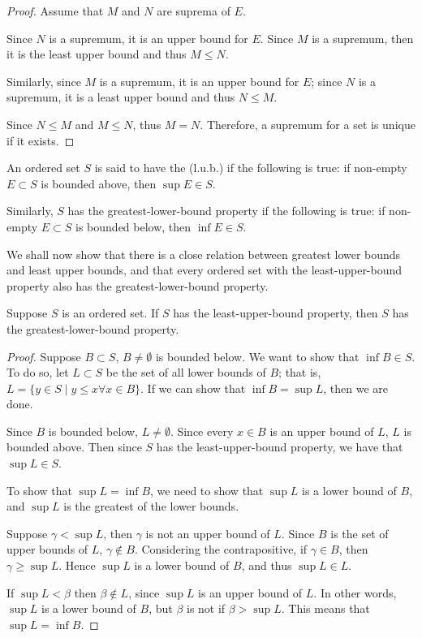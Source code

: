 \begin{proof}
Assume that $M$ and $N$ are suprema of $E$.

Since $N$ is a supremum, it is an upper bound for $E$. Since $M$ is a supremum, then it is the least upper bound and thus $M \le N$. 

Similarly, since $M$ is a supremum, it is an upper bound for $E$; since $N$ is a supremum, it is a least upper bound and thus $N \le M$.

Since $N \le M$ and $M \le N$, thus $M=N$. Therefore, a supremum for a set is unique if it exists.
\end{proof}

\begin{definition}
An ordered set $S$ is said to have the  (l.u.b.) if the following is true: if non-empty $E\subset S$ is bounded above, then $\sup E\in S$.

Similarly, $S$ has the greatest-lower-bound property if the following is true: if non-empty $E\subset S$ is bounded below, then $\inf E\in S$.
\end{definition}

We shall now show that there is a close relation between greatest lower bounds and least upper bounds, and that every ordered set with the least-upper-bound property also has the greatest-lower-bound property.

\begin{theorem}
Suppose $S$ is an ordered set. If $S$ has the least-upper-bound property, then $S$ has the greatest-lower-bound property.
\end{theorem}

\begin{proof}
Suppose $B\subset S$, $B\neq\emptyset$ is bounded below. We want to show that $\inf B\in S$. To do so, let $L\subset S$ be the set of all lower bounds of $B$; that is, $L=\{y\in S\mid y\le x\forall x\in B\}$. If we can show that $\inf B=\sup L$, then we are done.

Since $B$ is bounded below, $L\neq\emptyset$. Since every $x\in B$ is an upper bound of $L$, $L$ is bounded above. Then since $S$ has the least-upper-bound property, we have that $\sup L\in S$.

To show that $\sup L=\inf B$, we need to show that $\sup L$ is a lower bound of $B$, and $\sup L$ is the greatest of the lower bounds.

Suppose $\gamma<\sup L$, then $\gamma$ is not an upper bound of $L$. Since $B$ is the set of upper bounds of $L$, $\gamma\notin B$. Considering the contrapositive, if $\gamma\in B$, then $\gamma\ge\sup L$. Hence $\sup L$ is a lower bound of $B$, and thus $\sup L\in L$.

If $\sup L<\beta$ then $\beta\notin L$, since $\sup L$ is an upper bound of $L$. In other words, $\sup L$ is a lower bound of $B$, but $\beta$ is not if $\beta>\sup L$. This means that $\sup L=\inf B$.
\end{proof}

